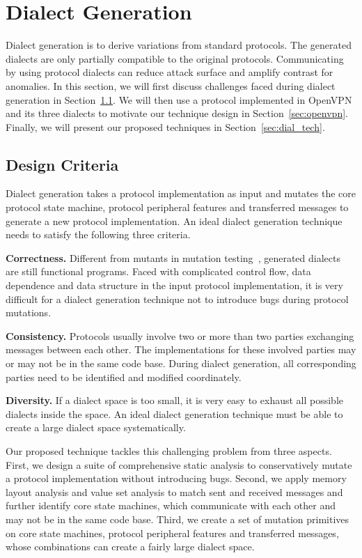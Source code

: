 \section{Dialect Generation}
\label{sec:dial}

Dialect generation is to derive variations from standard protocols. 
The generated dialects are only partially compatible to the original protocols. 
Communicating by using protocol dialects can reduce attack surface and amplify contrast for anomalies. 
In this section, we will first discuss challenges faced during dialect generation in Section~\ref{sec:dial_challenges}. 
We will then use a protocol implemented in OpenVPN and 
its three dialects to motivate our technique design in Section~\ref{sec:openvpn}. 
Finally, we will present our proposed techniques in Section~\ref{sec:dial_tech}. 



\subsection{Design Criteria}
\label{sec:dial_challenges}

Dialect generation takes a protocol implementation as input 
and mutates the core protocol state machine, 
protocol peripheral features and transferred messages 
to generate a new protocol implementation. 
An ideal dialect generation technique needs to satisfy the following three criteria. 

\textbf{Correctness.} 
Different from mutants in mutation testing~\citep{mtest,mtest2}, generated dialects are still functional programs. 
Faced with complicated control flow, data dependence and data structure in the input protocol implementation, 
it is very difficult for a dialect generation technique not to introduce bugs during protocol mutations. 


\textbf{Consistency.}
Protocols usually involve two or more than two parties exchanging messages between each other.
The implementations for these involved parties may or may not be in the same code base. 
During dialect generation, all corresponding parties need to be identified and modified coordinately. 


\textbf{Diversity.}
If a dialect space is too small, it is very easy to exhaust all possible dialects inside the space.
An ideal dialect generation technique must be able to create a large dialect space systematically. 


Our proposed technique tackles this challenging problem from three aspects. 
First, we design a suite of comprehensive static analysis to conservatively mutate a protocol
implementation without introducing bugs. 
Second, we apply memory layout analysis and value set analysis 
to match sent and received messages 
and further identify core state machines, which communicate with each other and may not be in the same code base. 
Third, we create a set of mutation primitives on core state machines, 
protocol peripheral features and transferred messages, 
whose combinations can create a fairly large dialect space. 


